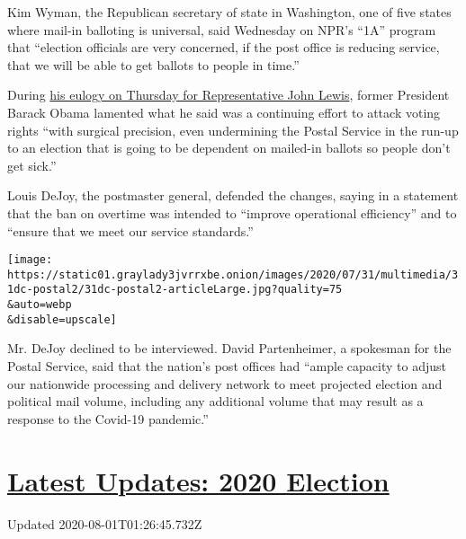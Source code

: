 Kim Wyman, the Republican secretary of state in Washington, one of five
states where mail-in balloting is universal, said Wednesday on NPR's
``1A'' program that ``election officials are very concerned, if the post
office is reducing service, that we will be able to get ballots to
people in time.''

During
\href{https://www.nytimes3xbfgragh.onion/2020/07/30/us/obama-eulogy-john-lewis-full-transcript.html}{his
eulogy on Thursday for Representative John Lewis}, former President
Barack Obama lamented what he said was a continuing effort to attack
voting rights ``with surgical precision, even undermining the Postal
Service in the run-up to an election that is going to be dependent on
mailed-in ballots so people don't get sick.''

Louis DeJoy, the postmaster general, defended the changes, saying in a
statement that the ban on overtime was intended to ``improve operational
efficiency'' and to ``ensure that we meet our service standards.''

\texttt{[image: https://static01.graylady3jvrrxbe.onion/images/2020/07/31/multimedia/31dc-postal2/31dc-postal2-articleLarge.jpg?quality=75\\\&auto=webp\\\&disable=upscale]}

Mr. DeJoy declined to be interviewed. David Partenheimer, a spokesman
for the Postal Service, said that the nation's post offices had ``ample
capacity to adjust our nationwide processing and delivery network to
meet projected election and political mail volume, including any
additional volume that may result as a response to the Covid-19
pandemic.''

\hypertarget{latest-updates-2020-election}{%
\section{\texorpdfstring{\href{https://www.nytimes3xbfgragh.onion/2020/07/31/us/elections/biden-vs-trump.html?action=click\&pgtype=Article\&state=default\&region=MAIN_CONTENT_1\&context=storylines_live_updates}{Latest
Updates: 2020
Election}}{Latest Updates: 2020 Election}}\label{latest-updates-2020-election}}

Updated 2020-08-01T01:26:45.732Z

